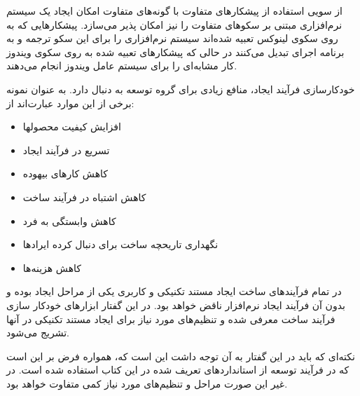 از سویی استفاده از پیشکارهای متفاوت با گونه‌های متفاوت امکان ایجاد یک سیستم
نرم‌افزاری مبتنی بر سکو‌های متفاوت را نیز امکان پذیر می‌سازد. پیشکارهایی که به
روی سکوی لینوکس تعبیه شده‌اند سیستم نرم‌افزاری را برای این
سکو ترجمه و به برنامه اجرای تبدیل می‌کنند در حالی که پیشکارهای تعبیه شده به روی
سکوی ویندوز کار مشابه‌ای را برای سیستم عامل ویندوز انجام
می‌دهند.


خودکارسازی فرآیند ایجاد، منافع زیادی برای گروه توسعه به دنبال دارد. به عنوان
نمونه برخی از این موارد عبارت‌اند از:

\begin{itemize}
  \item افزایش کیفیت محصولها
  \item تسریع در فرآیند ایجاد
  \item کاهش کارهای بیهوده
  \item کاهش اشتباه در فرآیند ساخت
  \item کاهش وابستگی به فرد
  \item نگهداری تاریحچه ساخت برای دنبال کرده ایرادها
  \item کاهش هزینه‌ها
\end{itemize}

% 
% 
% 
% 

در تمام فرآیندهای ساخت ایجاد مستند تکنیکی و کاربری یکی از مراحل ایجاد بوده و
بدون آن فرآیند ایجاد نرم‌افزار ناقض خواهد بود. در این گفتار ابزارهای خودکار سازی
فرآیند ساخت معرفی شده و تنظیم‌های مورد نیاز برای ایجاد مستند تکنیکی در آنها
تشریج می‌شود.

نکته‌ای که باید در این گفتار به آن توجه داشت این است که، همواره فرض بر این است
که در فرآیند توسعه از استانداردهای تعریف شده در این کتاب استفاده شده است. در غیر
این صورت مراحل و تنظیم‌های مورد نیاز کمی متفاوت خواهد بود.




% 

